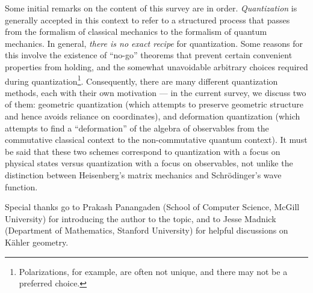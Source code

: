 Some initial remarks on the content of this survey are in order. \textit{Quantization} is generally accepted in this context to refer to a structured process that passes from the formalism of classical mechanics to the formalism of quantum mechanics. In general, \emph{there is no exact recipe} for quantization. Some reasons for this involve the existence of ``no-go'' theorems that prevent certain convenient properties from holding, and the somewhat unavoidable arbitrary choices required during quantization\footnote{Polarizations, for example, are often not unique, and there may not be a preferred choice.}. Consequently, there are many different quantization methods, each with their own motivation --- in the current survey, we discuss two of them: geometric quantization (which attempts to preserve geometric structure and hence avoids reliance on coordinates), and deformation quantization (which attempts to find a ``deformation'' of the algebra of observables from the commutative classical context to the non-commutative quantum context). It must be said that these two schemes correspond to quantization with a focus on physical states versus quantization with a focus on observables, not unlike the distinction between Heisenberg's matrix mechanics and Schr\"{o}dinger's wave function.


Special thanks go to Prakash Panangaden (School of Computer Science, McGill University) for introducing the author to the topic, and to Jesse Madnick (Department of Mathematics, Stanford University) for helpful discussions on K\"{a}hler geometry.